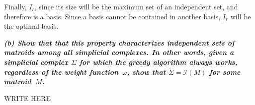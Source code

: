 Finally, $I_r$, since its size will be the maximum set of an independent set, and therefore is a basis. Since a basis cannot be contained in another basis, $I_r$ will be the optimal basis.
\vspace{3pt}

\hspace{5pt}\textbf{\textit{(b) Show that that this property characterizes independent sets of matroids among all simplicial complexes. In other words, given a simplicial complex $\Sigma$ for which the greedy algorithm always works, regardless of the weight function~$\omega$, show that $\Sigma = \mathcal I(M)$ for some matroid~$M$.}}

\vspace{3pt}

WRITE HERE
